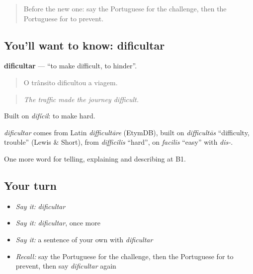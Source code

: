 \label{lesson:PT-C353-dificultar}



\begin{quote}
Before the new one: say the Portuguese for the challenge, then the Portuguese for to prevent.
\end{quote}

\subsection*{You'll want to know: dificultar}
\textbf{dificultar} — \textquotedblleft{}to make difficult, to hinder\textquotedblright{}.

\begin{quote}
O trânsito dificultou a viagem.
\end{quote}

\begin{quote}
\emph{The traffic made the journey difficult.}
\end{quote}

Built on \emph{difícil}: to make hard.

\begin{cousinweb}
\emph{dificultar} comes from Latin \emph{difficultāre} (EtymDB), built on \emph{difficultās} \textquotedblleft{}difficulty, trouble\textquotedblright{} (Lewis \& Short), from \emph{difficilis} \textquotedblleft{}hard\textquotedblright{}, on \emph{facilis} \textquotedblleft{}easy\textquotedblright{} with \emph{dis-}.
\end{cousinweb}

\begin{grammarlens}[title={What you've built}]
One more word for telling, explaining and describing at B1.
\end{grammarlens}

\subsection*{Your turn}
\begin{itemize}
\raggedright
  \item \emph{Say it:} \emph{dificultar}
  \item \emph{Say it:} \emph{dificultar}, once more
  \item \emph{Say it:} a sentence of your own with \emph{dificultar}
  \item \emph{Recall:} say the Portuguese for the challenge, then the Portuguese for to prevent, then say \emph{dificultar} again
\end{itemize}

